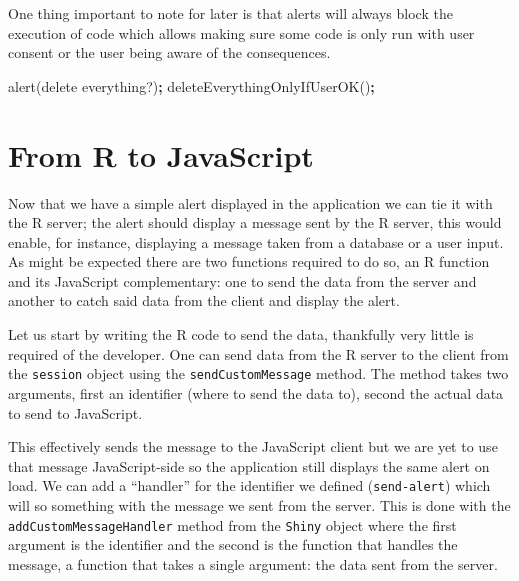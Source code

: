 \documentclass[
]{krantz}
\makeatletter
\newenvironment{Shaded}{\begin{snugshade}}{\end{snugshade}}
\newcommand{\CommentTok}[1]{\textcolor[rgb]{0.37,0.37,0.37}{\textit{#1}}}
\newcommand{\ControlFlowTok}[1]{\textcolor[rgb]{0.27,0.27,0.27}{\textbf{#1}}}
\newcommand{\DataTypeTok}[1]{\textcolor[rgb]{0.27,0.27,0.27}{#1}}
\newcommand{\KeywordTok}[1]{\textcolor[rgb]{0.27,0.27,0.27}{\textbf{#1}}}
\newcommand{\NormalTok}[1]{#1}
\newcommand{\OperatorTok}[1]{\textcolor[rgb]{0.43,0.43,0.43}{\textbf{#1}}}
\newcommand{\StringTok}[1]{\textcolor[rgb]{0.5,0.5,0.5}{#1}}
\newenvironment{kframe}{%
\medskip{}
\setlength{\fboxsep}{.8em}
 \def\at@end@of@kframe{}%
 \ifinner\ifhmode%
  \def\at@end@of@kframe{\end{minipage}}%
  \begin{minipage}{\columnwidth}%
 \fi\fi%
 \def\FrameCommand##1{\hskip\@totalleftmargin \hskip-\fboxsep
 \colorbox{shadecolor}{##1}\hskip-\fboxsep
     \hskip-\linewidth \hskip-\@totalleftmargin \hskip\columnwidth}%
 \MakeFramed {\advance\hsize-\width
   \@totalleftmargin\z@ \linewidth\hsize
   \@setminipage}}%
 {\par\unskip\endMakeFramed%
 \at@end@of@kframe}
\renewenvironment{Shaded}{\begin{kframe}}{\end{kframe}}
\makeatother
\begin{document}
One thing important to note for later is that alerts will always block the execution of code which allows making sure some code is only run with user consent or the user being aware of the consequences.

\begin{Shaded}
\begin{Highlighting}[]
\NormalTok{alert(}\StringTok{\textquotesingle{}delete everything?\textquotesingle{}}\NormalTok{)}\OperatorTok{;}
\NormalTok{deleteEverythingOnlyIfUserOK()}\OperatorTok{;}
\end{Highlighting}
\end{Shaded}

\hypertarget{shiny-intro-r-to-js}{%
\section{From R to JavaScript}\label{shiny-intro-r-to-js}}

Now that we have a simple alert displayed in the application we can tie it with the R server; the alert should display a message sent by the R server, this would enable, for instance, displaying a message taken from a database or a user input. As might be expected there are two functions required to do so, an R function and its JavaScript complementary: one to send the data from the server and another to catch said data from the client and display the alert.

Let us start by writing the R code to send the data, thankfully very little is required of the developer. One can send data from the R server to the client from the \texttt{session} object using the \texttt{sendCustomMessage} method. The method takes two arguments, first an identifier (where to send the data to), second the actual data to send to JavaScript.

\begin{Shaded}
\end{Shaded}

This effectively sends the message to the JavaScript client but we are yet to use that message JavaScript-side so the application still displays the same alert on load. We can add a ``handler'' for the identifier we defined (\texttt{send-alert}) which will so something with the message we sent from the server. This is done with the \texttt{addCustomMessageHandler} method from the \texttt{Shiny} object where the first argument is the identifier and the second is the function that handles the message, a function that takes a single argument: the data sent from the server.
\end{document}
